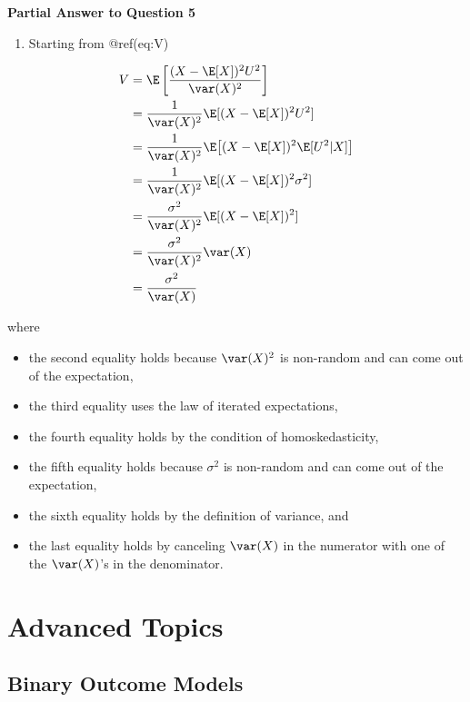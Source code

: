\documentclass[
  letterpaper,
  DIV=11,
  numbers=noendperiod]{scrreprt}
\providecommand{\tightlist}{%
  \setlength{\itemsep}{0pt}\setlength{\parskip}{0pt}}\usepackage{longtable,booktabs,array}
\begin{document}
\textbf{Partial Answer to Question 5}

\begin{enumerate}
\def\labelenumi{\alph{enumi})}
\tightlist
\item
  Starting from @ref(eq:V)
\end{enumerate}

\begin{align*}
    V &= \E\left[ \frac{(X - \E[X])^2 U^2}{\var(X)^2} \right] \\
    &= \frac{1}{\var(X)^2} \E[(X-\E[X])^2 U^2] \\
    &= \frac{1}{\var(X)^2} \E\big[(X-\E[X])^2 \E[U^2|X] \big] \\
    &= \frac{1}{\var(X)^2} \E[(X-\E[X])^2 \sigma^2 ] \\
    &= \frac{\sigma^2}{\var(X)^2} \E[(X-\E[X])^2] \\
    &= \frac{\sigma^2}{\var(X)^2} \var(X) \\
    &= \frac{\sigma^2}{\var(X)}
  \end{align*}

where

\begin{itemize}
\item
  the second equality holds because \(\var(X)^2\) is non-random and can
  come out of the expectation,
\item
  the third equality uses the law of iterated expectations,
\item
  the fourth equality holds by the condition of homoskedasticity,
\item
  the fifth equality holds because \(\sigma^2\) is non-random and can
  come out of the expectation,
\item
  the sixth equality holds by the definition of variance, and
\item
  the last equality holds by canceling \(\var(X)\) in the numerator with
  one of the \(\var(X)\)'s in the denominator.
\end{itemize}

\part{Advanced Topics}


\chapter{Binary Outcome Models}\label{binary-outcome-models}
\end{document}
